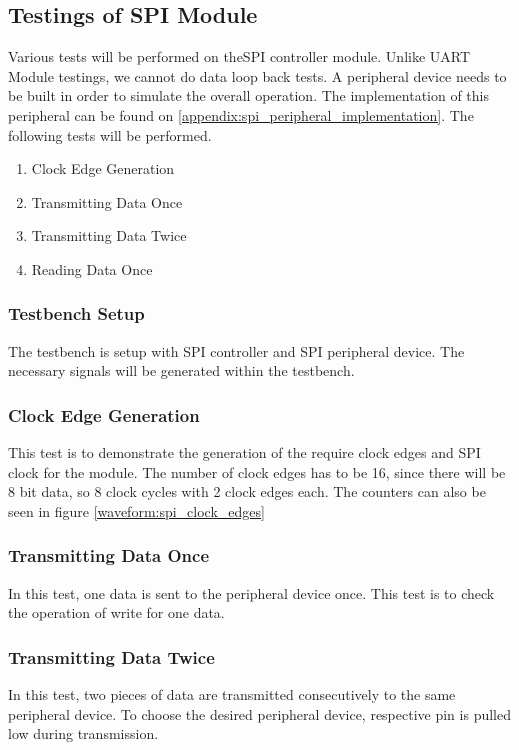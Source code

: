 \newpage
\subsection{Testings of SPI Module}
Various tests will be performed on theSPI controller module. Unlike UART Module testings, we cannot do data loop back tests. A peripheral device needs to be built in order to simulate the overall operation. The implementation of this peripheral can be found on \ref{appendix:spi_peripheral_implementation}. The following tests will be performed.
\begin{enumerate}
	\item Clock Edge Generation
	\item Transmitting Data Once
	\item Transmitting Data Twice
	\item Reading Data Once
\end{enumerate}

\subsubsection{Testbench Setup}
The testbench is setup with SPI controller and SPI peripheral device. The necessary signals will be generated within the testbench.


\subsubsection{Clock Edge Generation}
This test is to demonstrate the generation of the require clock edges and SPI clock for the module. The number of clock edges has to be 16, since there will be 8 bit data, so 8 clock cycles with 2 clock edges each. The counters can also be seen in figure \ref{waveform:spi_clock_edges}

\newpage
\subsubsection{Transmitting Data Once}
In this test, one data is sent to the peripheral device once. This test is to check the operation of write for one data.

\subsubsection{Transmitting Data Twice}
In this test, two pieces of data are transmitted consecutively to the same peripheral device. To choose the desired peripheral device, respective  pin is pulled low during transmission.

